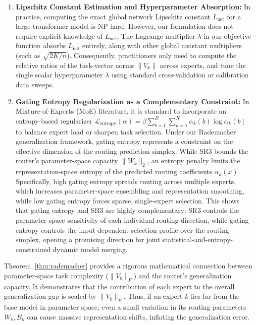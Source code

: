 \begin{enumerate}
    \item \textbf{Lipschitz Constant Estimation and Hyperparameter Absorption:} In practice, computing the exact global network Lipschitz constant $L_{\text{net}}$ for a large transformer model is NP-hard. However, our formulation does not require explicit knowledge of $L_{\text{net}}$. The Lagrange multiplier $\lambda$ in our objective function absorbs $L_{\text{net}}$ entirely, along with other global constant multipliers (such as $\sqrt{2K/n}$). Consequently, practitioners only need to compute the relative ratios of the task-vector norms $\|V_k\|$ across experts, and tune the single scalar hyperparameter $\lambda$ using standard cross-validation or calibration data sweeps.
    \item \textbf{Gating Entropy Regularization as a Complementary Constraint:} In Mixture-of-Experts (MoE) literature, it is standard to incorporate an entropy-based regularizer $\mathcal{L}_{\text{entropy}}(\alpha) = \beta \sum_{b=1}^B \sum_{k=1}^K \alpha_{k}(b) \log \alpha_{k}(b)$ to balance expert load or sharpen task selection. Under our Rademacher generalization framework, gating entropy represents a constraint on the effective dimension of the routing prediction simplex. While SR3 bounds the router's parameter-space capacity $\|W_k\|_2$, an entropy penalty limits the representation-space entropy of the predicted routing coefficients $\alpha_k(x)$. Specifically, high gating entropy spreads routing across multiple experts, which increases parameter-space ensembling and representation smoothing, while low gating entropy forces sparse, single-expert selection. This shows that gating entropy and SR3 are highly complementary: SR3 controls the parameter-space sensitivity of each individual routing direction, while gating entropy controls the input-dependent selection profile over the routing simplex, opening a promising direction for joint statistical-and-entropy-constrained dynamic model merging.
\end{enumerate}

Theorem~\ref{thm:rademacher} provides a rigorous mathematical connection between parameter-space task complexity ($\|V_k\|_F$) and the router's generalization capacity. It demonstrates that the contribution of each expert to the overall generalization gap is scaled by $\|V_k\|_F$. Thus, if an expert $k$ lies far from the base model in parameter space, even a small variation in its routing parameters $W_k, B_k$ can cause massive representation shifts, inflating the generalization error.

